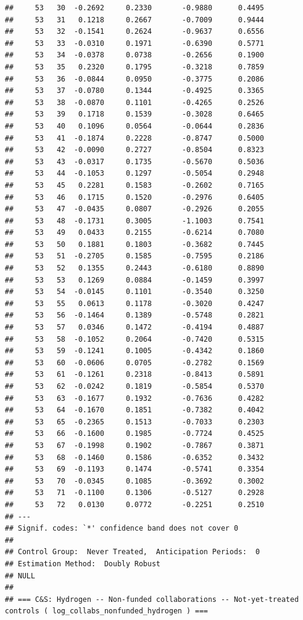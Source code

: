 \documentclass[
]{article}
\begin{document}
\begin{verbatim}
##     53   30  -0.2692     0.2330       -0.9880      0.4495 
##     53   31   0.1218     0.2667       -0.7009      0.9444 
##     53   32  -0.1541     0.2624       -0.9637      0.6556 
##     53   33  -0.0310     0.1971       -0.6390      0.5771 
##     53   34  -0.0378     0.0738       -0.2656      0.1900 
##     53   35   0.2320     0.1795       -0.3218      0.7859 
##     53   36  -0.0844     0.0950       -0.3775      0.2086 
##     53   37  -0.0780     0.1344       -0.4925      0.3365 
##     53   38  -0.0870     0.1101       -0.4265      0.2526 
##     53   39   0.1718     0.1539       -0.3028      0.6465 
##     53   40   0.1096     0.0564       -0.0644      0.2836 
##     53   41  -0.1874     0.2228       -0.8747      0.5000 
##     53   42  -0.0090     0.2727       -0.8504      0.8323 
##     53   43  -0.0317     0.1735       -0.5670      0.5036 
##     53   44  -0.1053     0.1297       -0.5054      0.2948 
##     53   45   0.2281     0.1583       -0.2602      0.7165 
##     53   46   0.1715     0.1520       -0.2976      0.6405 
##     53   47  -0.0435     0.0807       -0.2926      0.2055 
##     53   48  -0.1731     0.3005       -1.1003      0.7541 
##     53   49   0.0433     0.2155       -0.6214      0.7080 
##     53   50   0.1881     0.1803       -0.3682      0.7445 
##     53   51  -0.2705     0.1585       -0.7595      0.2186 
##     53   52   0.1355     0.2443       -0.6180      0.8890 
##     53   53   0.1269     0.0884       -0.1459      0.3997 
##     53   54  -0.0145     0.1101       -0.3540      0.3250 
##     53   55   0.0613     0.1178       -0.3020      0.4247 
##     53   56  -0.1464     0.1389       -0.5748      0.2821 
##     53   57   0.0346     0.1472       -0.4194      0.4887 
##     53   58  -0.1052     0.2064       -0.7420      0.5315 
##     53   59  -0.1241     0.1005       -0.4342      0.1860 
##     53   60  -0.0606     0.0705       -0.2782      0.1569 
##     53   61  -0.1261     0.2318       -0.8413      0.5891 
##     53   62  -0.0242     0.1819       -0.5854      0.5370 
##     53   63  -0.1677     0.1932       -0.7636      0.4282 
##     53   64  -0.1670     0.1851       -0.7382      0.4042 
##     53   65  -0.2365     0.1513       -0.7033      0.2303 
##     53   66  -0.1600     0.1985       -0.7724      0.4525 
##     53   67  -0.1998     0.1902       -0.7867      0.3871 
##     53   68  -0.1460     0.1586       -0.6352      0.3432 
##     53   69  -0.1193     0.1474       -0.5741      0.3354 
##     53   70  -0.0345     0.1085       -0.3692      0.3002 
##     53   71  -0.1100     0.1306       -0.5127      0.2928 
##     53   72   0.0130     0.0772       -0.2251      0.2510 
## ---
## Signif. codes: `*' confidence band does not cover 0
## 
## Control Group:  Never Treated,  Anticipation Periods:  0
## Estimation Method:  Doubly Robust
## NULL
## 
## === C&S: Hydrogen -- Non-funded collaborations -- Not-yet-treated controls ( log_collabs_nonfunded_hydrogen ) ===
\end{verbatim}
\end{document}
